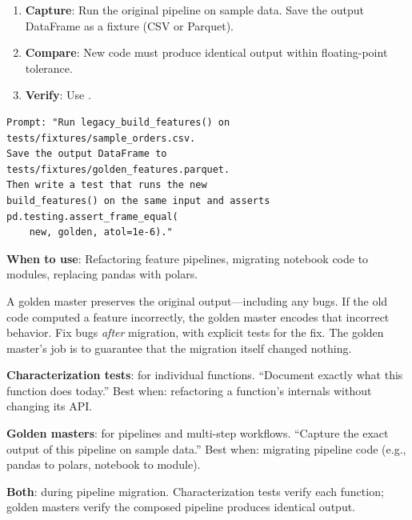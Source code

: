 \begin{enumerate}
  \item \textbf{Capture}: Run the original pipeline on sample data.
    Save the output DataFrame as a fixture (CSV or Parquet).
  \item \textbf{Compare}: New code must produce identical output
    within floating-point tolerance.
  \item \textbf{Verify}: Use .
\end{enumerate}

\begin{verbatim}
Prompt: "Run legacy_build_features() on
tests/fixtures/sample_orders.csv.
Save the output DataFrame to
tests/fixtures/golden_features.parquet.
Then write a test that runs the new
build_features() on the same input and asserts
pd.testing.assert_frame_equal(
    new, golden, atol=1e-6)."
\end{verbatim}

\textbf{When to use}: Refactoring feature pipelines, migrating notebook code
to modules, replacing pandas with polars.

\begin{whybox}
A golden master preserves the original output---including any bugs.
If the old code computed a feature incorrectly, the golden master encodes
that incorrect behavior. Fix bugs \emph{after} migration, with explicit tests
for the fix. The golden master's job is to guarantee that the migration
itself changed nothing.
\end{whybox}

\begin{decisionbox}
\textbf{Characterization tests}: for individual functions.
``Document exactly what this function does today.''
Best when: refactoring a function's internals without changing its API.

\textbf{Golden masters}: for pipelines and multi-step workflows.
``Capture the exact output of this pipeline on sample data.''
Best when: migrating pipeline code (e.g., pandas to polars, notebook to module).

\textbf{Both}: during pipeline migration.
Characterization tests verify each function; golden masters verify
the composed pipeline produces identical output.
\end{decisionbox}



